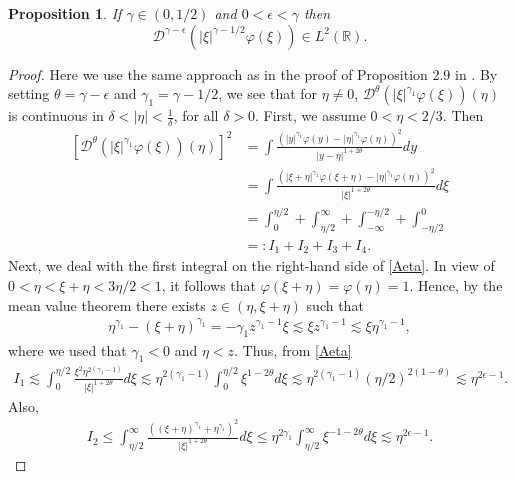 \documentclass[reqno]{amsart}
\newcommand{\les}{\lesssim}
\newcommand{\R}{\mathbb R}
\numberwithin{equation}{section}
\newtheorem{proposition}[theorem]{Proposition}
\begin{document}
\begin{proposition}\label{DsteinL3}
If $\gamma \in (0,1/2)$ and $0<\epsilon<\gamma$ then
\begin{equation}\label{Dstein3}
\mathcal{D}^{\gamma-\epsilon} (|\xi|^{\gamma-1/2}\varphi (\xi))\in L^{2}(\R).
\end{equation}
\end{proposition}
\begin{proof} Here we use the same approach as in the proof of Proposition 2.9 in \cite{FLP1}. By setting $\theta=\gamma-\epsilon$ and $\gamma_1=\gamma-1/2$, we  see that for $\eta \neq 0$, $\mathcal{D}^\theta (|\xi|^{\gamma_1}\varphi(\xi))(\eta)$ is continuous in $\delta<|\eta|<\frac{1}{\delta}$, for all $\delta>0$.
First, we assume $0<\eta<2/3$. Then
	\begin{equation}
	\begin{split}\label{Aeta}
	[\mathcal{D}^\theta (|\xi|^{\gamma_1}\varphi(\xi))(\eta)]^2 &=\int \frac{(|y|^{\gamma_1}\varphi(y) -|\eta|^{\gamma_1}\varphi(\eta))^{2}}{|y-\eta|^{1+2\theta}}dy\\
	&=\int \frac{(|\xi+\eta|^{\gamma_1} \varphi(\xi+\eta)-|\eta|^{\gamma_1}\varphi(\eta))^2}{|\xi|^{1+2\theta}}d\xi\\
	&= \int_0^{\eta/2}+\int_{\eta/2}^\infty+\int_{-\infty}^{-\eta/2}+\int_{-\eta/2}^0\\
	&=: I_1+I_2+I_3+I_4.
	\end{split}
	\end{equation}
	Next, we  deal with the first integral on the right-hand side of \eqref{Aeta}. In view of $0<\eta<\xi+\eta<3\eta/2<1$, it follows that $\varphi(\xi+\eta)=\varphi(\eta)=1$. Hence, by the mean value theorem there exists $z\in(\eta, \xi+\eta)$ such that
	\begin{equation*}
	\begin{split}
	\eta^{\gamma_1}-(\xi+\eta)^{\gamma_1}=-\gamma_1 z^{\gamma_1 -1}\xi
	\les \xi z^{\gamma_1 -1}
	\les \xi \eta^{\gamma_1 -1},
	\end{split}
	\end{equation*}
	where  we used that $\gamma_1<0$ and $\eta<z$. Thus, from \eqref{Aeta}
	\begin{equation*}
	\begin{split}
	I_1 \les \int_0^{\eta/2}\frac{\xi^2 \eta^{2(\gamma_1 -1)}}{|\xi|^{1+2\theta}}d\xi
	\les  \eta^{2(\gamma_1-1)}\int_{0}^{\eta/2}\xi^{1-2\theta}d\xi
	\les  \eta^{2(\gamma_1-1)} (\eta/2)^{2(1-\theta)}
	\les \eta^{2\epsilon-1}.
	\end{split}
	\end{equation*}
Also,
	\begin{equation*}
	\begin{split}
	I_2\leq \int_{\eta/2}^\infty \frac{((\xi+\eta)^{\gamma_1}+\eta^{\gamma_1})^2}{|\xi|^{1+2\theta}}d\xi
	\leq \eta^{2\gamma_1}\int_{\eta/2}^\infty \xi^{-1-2\theta}d\xi
	\les \eta^{2\epsilon-1}.
	\end{split}
	\end{equation*}
	

\end{proof}
\end{document}
